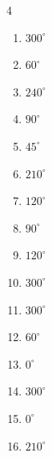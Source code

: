 \begin{multicols}{4}
\begin{enumerate}
  \item $\displaystyle 300^{\circ}$

  \item $\displaystyle 60^{\circ}$

  \item $\displaystyle 240^{\circ}$

  \item $\displaystyle 90^{\circ}$

  \item $\displaystyle 45^{\circ}$

\columnbreak %

  \item $\displaystyle 210^{\circ}$

  \item $\displaystyle 120^{\circ}$

  \item $\displaystyle 90^{\circ}$

  \item $\displaystyle 120^{\circ}$

  \item $\displaystyle 300^{\circ}$

  \item $\displaystyle 300^{\circ}$

  \item $\displaystyle 60^{\circ}$

  \item $\displaystyle 0^{\circ}$
        \phantom{$\displaystyle =0$}

  \item $\displaystyle 300^{\circ}$

  \item $\displaystyle 0^{\circ}$
        \phantom{$\displaystyle =0$}

  \item $\displaystyle 210^{\circ}$


\end{enumerate}
\end{multicols}
